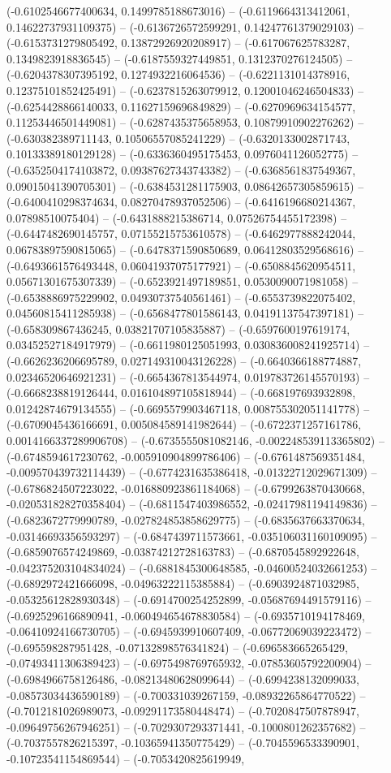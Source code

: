 	(-0.6102546677400634, 0.1499785188673016) -- (-0.6119664313412061, 0.14622737931109375) -- (-0.6136726572599291, 0.14247761379029103) -- (-0.6153731279805492, 0.13872926920208917) -- (-0.617067625783287, 0.1349823918836545) -- (-0.6187559327449851, 0.1312370276124505) -- (-0.6204378307395192, 0.1274932216064536) -- (-0.6221131014378916, 0.12375101852425491) -- (-0.6237815263079912, 0.12001046246504833) -- (-0.6254428866140033, 0.11627159696849829) -- (-0.6270969634154577, 0.11253446501449081) -- (-0.6287435375658953, 0.10879910902276262) -- (-0.630382389711143, 0.10506557085241229) -- (-0.6320133002871743, 0.10133389180129128) -- (-0.6336360495175453, 0.0976041126052775) -- (-0.6352504174103872, 0.09387627343743382) -- (-0.6368561837549367, 0.09015041390705301) -- (-0.6384531281175903, 0.08642657305859615) -- (-0.6400410298374634, 0.08270478937052506) -- (-0.6416196680214367, 0.07898510075404) -- (-0.6431888215386714, 0.07526754455172398) -- (-0.6447482690145757, 0.07155215753610578) -- (-0.6462977888242044, 0.06783897590815065) -- (-0.6478371590850689, 0.06412803529568616) -- (-0.6493661576493448, 0.06041937075177921) -- (-0.6508845620954511, 0.05671301675307339) -- (-0.6523921497189851, 0.0530090071981058) -- (-0.6538886975229902, 0.04930737540561461) -- (-0.6553739822075402, 0.04560815411285938) -- (-0.6568477801586143, 0.04191137547397181) -- (-0.658309867436245, 0.03821707105835887) -- (-0.6597600197619174, 0.03452527184917979) -- (-0.6611980125051993, 0.030836008241925714) -- (-0.6626236206695789, 0.027149310043126228) -- (-0.6640366188774887, 0.02346520646921231) -- (-0.6654367813544974, 0.019783726145570193) -- (-0.6668238819126444, 0.016104897105818944) -- (-0.668197693932898, 0.01242874679134555) -- (-0.6695579903467118, 0.008755302051141778) -- (-0.6709045436166691, 0.005084589141982644) -- (-0.6722371257161786, 0.0014166337289906708) -- (-0.6735555081082146, -0.002248539113365802) -- (-0.6748594617230762, -0.005910904899786406) -- (-0.6761487569351484, -0.009570439732114439) -- (-0.6774231635386418, -0.01322712029671309) -- (-0.6786824507223022, -0.016880923861184068) -- (-0.6799263870430668, -0.020531828270358404) -- (-0.6811547403986552, -0.02417981194149836) -- (-0.6823672779990789, -0.027824853858629775) -- (-0.6835637663370634, -0.03146693356593297) -- (-0.6847439711573661, -0.035106031160109095) -- (-0.6859076574249869, -0.03874212728163783) -- (-0.6870545892922648, -0.042375203104834024) -- (-0.6881845300648585, -0.04600524032661253) -- (-0.6892972421666098, -0.04963222115385884) -- (-0.6903924871032985, -0.05325612828930348) -- (-0.6914700254252899, -0.05687694491579116) -- (-0.6925296166890941, -0.060494654678830584) -- (-0.6935710194178469, -0.06410924166730705) -- (-0.6945939910607409, -0.06772069039223472) -- (-0.695598287951428, -0.07132898576341824) -- (-0.696583665265429, -0.07493411306389423) -- (-0.6975498769765932, -0.07853605792200904) -- (-0.6984966758126486, -0.08213480628099644) -- (-0.6994238132099033, -0.08573034436590189) -- (-0.700331039267159, -0.08932265864770522) -- (-0.7012181026989073, -0.09291173580448474) -- (-0.7020847507878947, -0.09649756267946251) -- (-0.7029307293371441, -0.1000801262357682) -- (-0.7037557826215397, -0.10365941350775429) -- (-0.7045596533390901, -0.10723541154869544) -- (-0.7053420825619949, 